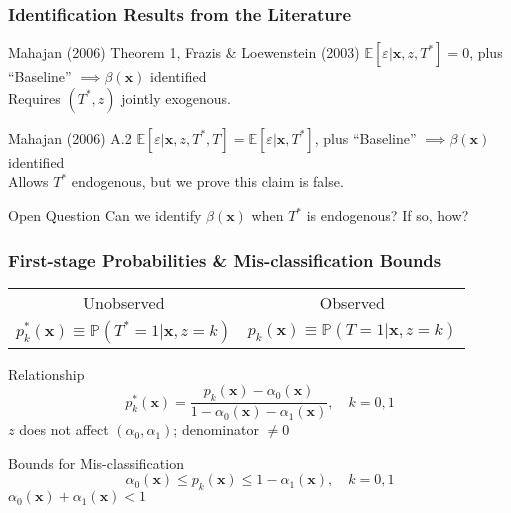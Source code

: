 \documentclass{beamer}
\begin{document}
\begin{frame}
  \frametitle{Identification Results from the Literature}

  \begin{block}{Mahajan (2006) Theorem 1, Frazis \& Loewenstein (2003)}
    $\mathbb{E}[\varepsilon|\mathbf{x},z,T^*] = 0$, plus ``Baseline'' $\implies \beta(\mathbf{x})$ identified\\
   \hfill \alert{Requires $(T^*,z)$ jointly exogenous.}
  \end{block}

  \begin{block}{Mahajan (2006) A.2}
    $\mathbb{E}[\varepsilon|\mathbf{x}, z, T^*, T] = \mathbb{E}[\varepsilon|\mathbf{x},T^*]$, plus ``Baseline'' $\implies \beta(\mathbf{x})$ identified\\
    \hfill \alert{Allows $T^*$ endogenous, but we prove this claim is false.}
  \end{block}


  \begin{block}{Open Question}
    Can we identify $\beta(\mathbf{x})$ when $T^*$ is endogenous? If so, how?
  \end{block}


\end{frame}
\begin{frame}
  \frametitle{First-stage Probabilities \& Mis-classification Bounds} 

  \begin{table}[h]
    \centering
  \begin{tabular}[h]{|c|c|}
    \hline
   Unobserved & Observed \\
    $p^*_k(\mathbf{x}) \equiv \mathbb{P}(T^*=1|\mathbf{x}, z=k)$ & 
    $p_k(\mathbf{x}) \equiv \mathbb{P}(T=1|\mathbf{x}, z=k)$\\
    \hline
  \end{tabular}
\end{table}


  \begin{block}{Relationship}
    \vspace{-1em}
   \[
     p_k^*(\mathbf{x}) = \frac{p_k(\mathbf{x}) - \alpha_0(\mathbf{x})}{1 - \alpha_0(\mathbf{x}) - \alpha_1(\mathbf{x})}, \quad k = 0,1
   \]
   \hfill\alert{\footnotesize $z$ does not affect $(\alpha_0, \alpha_1)$; denominator $\neq 0$}
  \end{block}

  \normalsize
  \begin{block}{Bounds for Mis-classification}
    \vspace{-1em}
    \[
      \alpha_0(\mathbf{x}) \leq p_k(\mathbf{x}) \leq 1 - \alpha_1(\mathbf{x}), \quad k = 0,1
    \]
   \hfill \alert{\footnotesize$\alpha_0(\mathbf{x}) + \alpha_1(\mathbf{x}) <1$}
  \end{block}

\end{frame}
\end{document}
